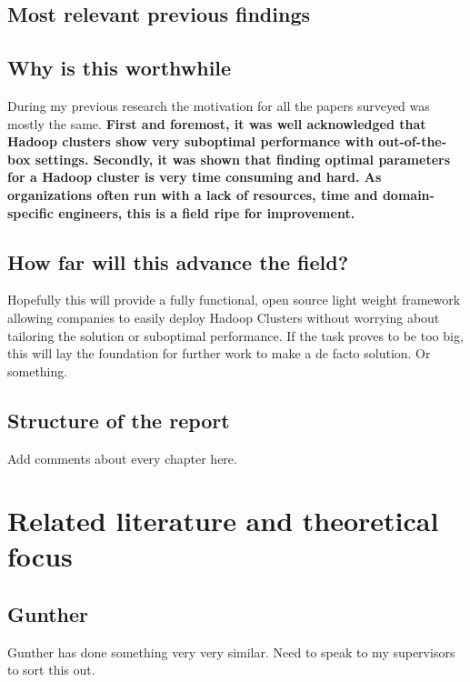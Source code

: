 \documentclass[a4paper,english]{report}
\begin{document}
		\section{Most relevant previous findings}
		\section{Why is this worthwhile}
		During my previous research the motivation for all the papers surveyed was mostly the same. \textbf{First and foremost, it was well acknowledged that Hadoop clusters show very suboptimal performance with out-of-the-box settings. Secondly, it was shown that finding optimal parameters for a Hadoop cluster is very time consuming and hard. As organizations often run with a lack of resources, time and domain-specific engineers, this is a field ripe for improvement.}
		\section{How far will this advance the field?}
		Hopefully this will provide a fully functional, open source light weight framework allowing companies to easily deploy Hadoop Clusters without worrying about tailoring the solution or suboptimal performance. If the task proves to be too big, this will lay the foundation for further work to make a de facto solution. Or something.
		\section{Structure of the report}
		Add comments about every chapter here.
	\chapter{Related literature and theoretical focus}
		\section{Gunther}
		Gunther\cite{gunther} has done something very very similar. Need to speak to my supervisors to sort this out.
\end{document}
